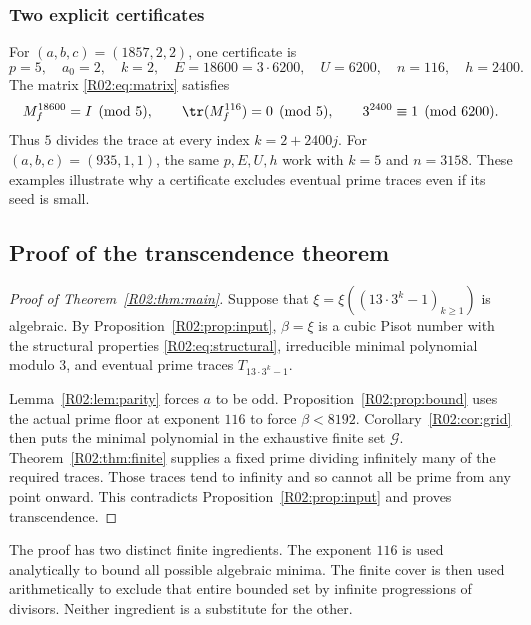 \documentclass[11pt,a4paper]{article}
\theoremstyle{definition}\newtheorem{definition}[theorem]{Definition}
\theoremstyle{remark}\newtheorem{remark}[theorem]{Remark}
\begin{document}
\subsubsection{Two explicit certificates}

For $(a,b,c)=(1857,2,2)$, one certificate is
\[
 p=5,\quad a_0=2,\quad k=2,\quad
 E=18600=3\cdot6200,\quad U=6200,\quad n=116,\quad h=2400.
\]
The matrix \eqref{R02:eq:matrix} satisfies
\[
 M_f^{18600}=I\pmod5,\qquad \tr(M_f^{116})=0\pmod5,
 \qquad 3^{2400}\equiv1\pmod{6200}.
\]
Thus $5$ divides the trace at every index $k=2+2400j$.
For $(a,b,c)=(935,1,1)$, the same $p,E,U,h$ work with
$k=5$ and $n=3158$. These examples illustrate why a certificate
excludes eventual prime traces even if its seed is small.

\subsection{Proof of the transcendence theorem}

\begin{proof}[Proof of Theorem~\ref{R02:thm:main}]
Suppose that $\xi=\xi((13\cdot3^k-1)_{k\ge1})$ is algebraic.
By Proposition~\ref{R02:prop:input}, $\beta=\xi$ is a cubic Pisot number
with the structural properties \eqref{R02:eq:structural}, irreducible
minimal polynomial modulo $3$, and eventual prime traces
$T_{13\cdot3^k-1}$.

Lemma~\ref{R02:lem:parity} forces $a$ to be odd.
Proposition~\ref{R02:prop:bound} uses the actual prime floor at exponent
$116$ to force $\beta<8192$. Corollary~\ref{R02:cor:grid} then puts the
minimal polynomial in the exhaustive finite set $\mathcal G$.
Theorem~\ref{R02:thm:finite} supplies a fixed prime dividing infinitely
many of the required traces. Those traces tend to infinity and so
cannot all be prime from any point onward. This contradicts
Proposition~\ref{R02:prop:input} and proves transcendence.
\end{proof}

The proof has two distinct finite ingredients. The exponent $116$
is used analytically to bound all possible algebraic minima. The
finite cover is then used arithmetically to exclude that entire bounded
set by infinite progressions of divisors. Neither ingredient is a
substitute for the other.
\end{document}
